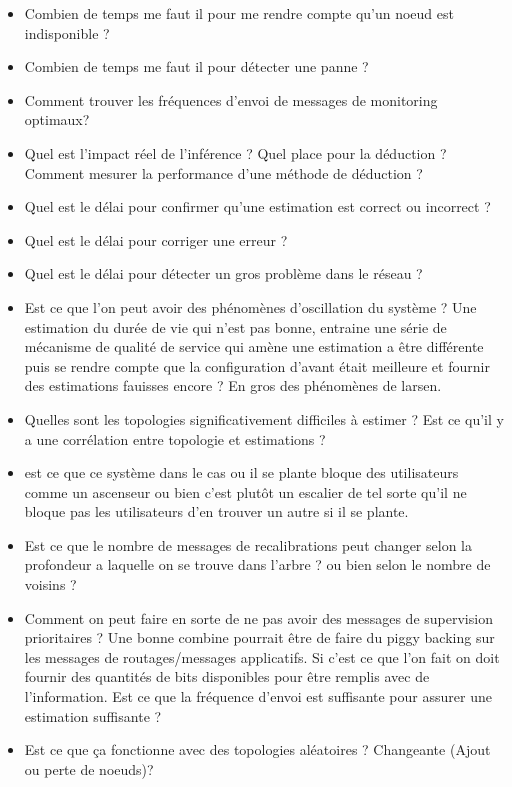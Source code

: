 \begin{itemize}
	\item Combien de temps me faut il pour me rendre compte qu'un noeud est indisponible ?
	\item Combien de temps me faut il pour détecter une panne ?
	\item Comment trouver les fréquences d'envoi de messages de monitoring optimaux?
	\item Quel est l'impact réel de l'inférence ? Quel place pour la déduction ? Comment mesurer la performance d'une méthode de déduction ?
	\item Quel est le délai pour confirmer qu'une estimation est correct ou incorrect ?
	\item Quel est le délai pour corriger une erreur ?
	\item Quel est le délai pour détecter un gros problème dans le réseau ?
	\item Est ce que l'on peut avoir des phénomènes d'oscillation du système ? Une estimation
	du durée de vie qui n'est pas bonne, entraine une série de mécanisme de qualité de service qui amène une estimation a être différente puis se rendre compte que la configuration d'avant était meilleure et fournir des estimations fauisses encore ? En gros des phénomènes de larsen.
	\item Quelles sont les topologies significativement difficiles à estimer ? Est ce qu'il y a une corrélation entre topologie et estimations ?

	\item est ce que ce système dans le cas ou il se plante bloque des utilisateurs comme 
	un ascenseur ou bien c'est plutôt un escalier de tel sorte qu'il ne bloque pas les utilisateurs d'en trouver un autre si il se plante.

	\item Est ce que le nombre de messages de recalibrations peut changer selon la profondeur a laquelle on se trouve dans l'arbre ? ou bien selon le nombre de voisins ?

	\item Comment on peut faire en sorte de ne pas avoir des messages de supervision prioritaires ? Une bonne combine pourrait être de faire du piggy backing sur les messages de routages/messages applicatifs. Si c'est ce que l'on fait on doit fournir des quantités de bits disponibles pour être remplis avec de l'information. Est ce que la fréquence d'envoi est suffisante pour assurer une estimation suffisante ?

	\item Est ce que ça fonctionne avec des topologies aléatoires ? Changeante (Ajout ou perte de noeuds)?

\end{itemize}


